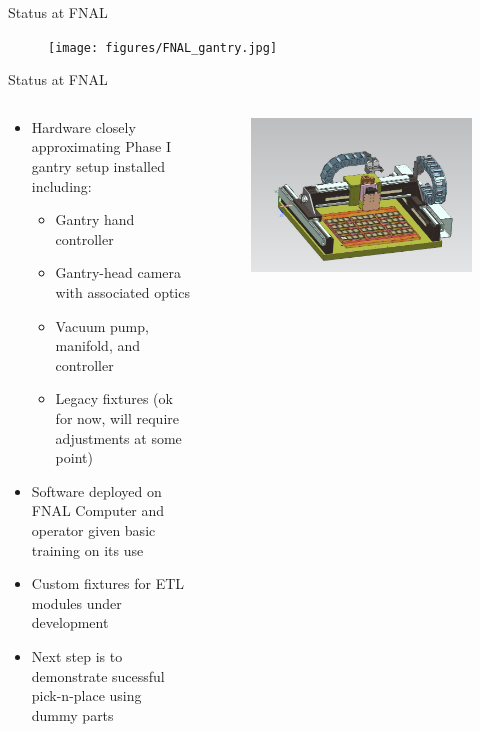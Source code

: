 \documentclass[english,aspectratio=43,8pt]{beamer}
\begin{document}
\begin{frame}{Status at FNAL}
    \begin{figure}
        \texttt{[image: figures/FNAL\_gantry.jpg]}
    \end{figure}
\end{frame}

\begin{frame}{Status at FNAL}
  \begin{columns}
    \begin{column}{0.5\textwidth}
      \begin{itemize}
          \item Hardware closely approximating Phase I gantry setup installed including:
            \begin{itemize}
              \item Gantry hand controller
              \item Gantry-head camera with associated optics
              \item Vacuum pump, manifold, and controller
              \item Legacy fixtures (ok for now, will require adjustments at some point)
            \end{itemize}
          \item Software deployed on FNAL Computer and operator given basic training on its use
          \item Custom fixtures for ETL modules under development
          \item Next step is to demonstrate sucessful pick-n-place using dummy parts
      \end{itemize}
    \end{column}
    \begin{column}{0.5\textwidth}
        \begin{figure}
            \includegraphics[width=\textwidth]{figures/isoview_ETLassembly.jpg}

\end{figure}
\end{column}
\end{columns}
\end{frame}
\end{document}
